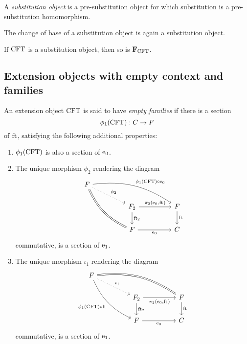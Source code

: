 \begin{defn}
A \emph{substitution object} is a pre-substitution object for which substitution is
a pre-substitution homomorphism.
\end{defn}

\begin{cor}
The change of base of a substitution object is again a substitution object.
\end{cor}

\begin{cor}
If $\mathrm{CFT}$ is a substitution object, then so is $\mathbf{F}_{\mathrm{CFT}}$.
\end{cor}

\subsection{Extension objects with empty context and families}

\begin{defn}
An extension object $\mathrm{CFT}$ is said to have \emph{empty families} if there
is a section
\begin{equation*}
\phi_1(\mathrm{CFT}):C\to F
\end{equation*}
of $\mathrm{ft}_{}$, satisfying the following additional properties:
\begin{enumerate}
\item $\phi_1(\mathrm{CFT})$ is also a section of $\mathrm{e}_{0}$.
\item The unique morphism $\phi_2$ rendering the diagram
\begin{equation*}
\begin{tikzcd}[column sep=huge]
\stesysf
  \ar[bend left=20]{drr}{\phi_1(\stesys)\circ\ectxext}
  \ar[equals,bend right=20]{ddr}
  \ar[dotted]{dr}{\phi_2}
  \\
  {}&
\stesysf_2
  \ar{d}{\eft[2]}
  \ar{r}{\pullbackpr{2}{\ectxext}{\eft}}
  &
\stesysf
  \ar{d}{\eft}
  \\
  {}&
\stesysf
  \ar{r}[swap]{\ectxext}
  &
\stesysc
\end{tikzcd}
\end{equation*}
commutative, is a section of $\mathrm{e}_{1}$.
\item The unique morphism $\iota_1$ rendering the diagram
\begin{equation*}
\begin{tikzcd}[column sep=huge]
\stesysf
  \ar[equals,bend left=20]{drr}
  \ar[bend right=20]{ddr}[swap]{\phi_1(\stesys)\circ\eft}
  \ar[dotted]{dr}{\iota_1}
  \\
  {}&
\stesysf_2
  \ar{d}{\eft[2]}
  \ar{r}[swap]{\pullbackpr{2}{\ectxext}{\eft}}
  &
\stesysf
  \ar{d}{\eft}
  \\
  {}&
\stesysf
  \ar{r}[swap]{\ectxext}
  &
\stesysc
\end{tikzcd}
\end{equation*}
commutative, is a section of $\mathrm{e}_{1}$.
\end{enumerate}
\end{defn}

